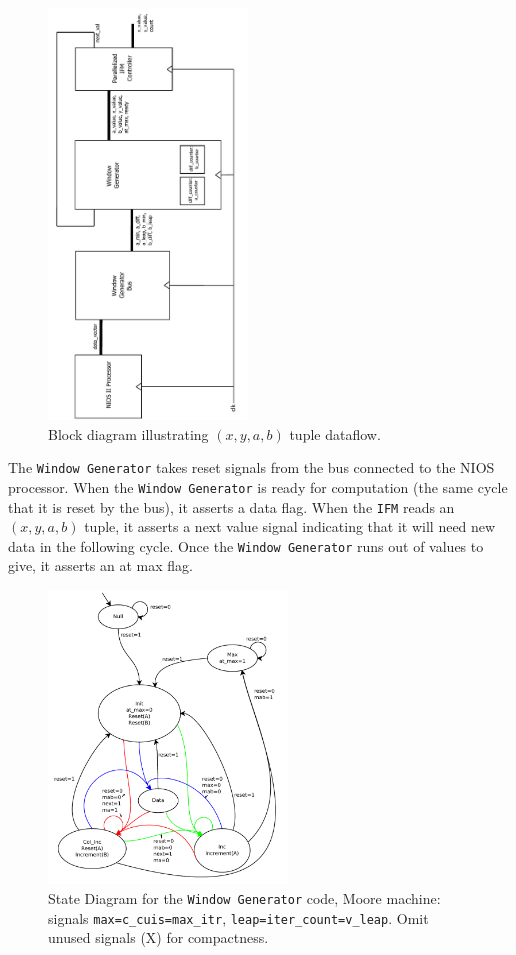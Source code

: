 \documentclass{article}
\begin{document}
\begin{figure}
  \centering
    \includegraphics[width=150pt, angle=270]{block_diagrams/win_gen_interior.pdf}
  \caption{Block diagram illustrating $(x, y, a, b)$ tuple dataflow.}
\end{figure}

The \texttt{Window Generator} takes reset signals from the bus connected to the NIOS processor. When the \texttt{Window
Generator} is ready for computation (the same cycle that it is reset by the bus), it asserts a data flag.
When the \texttt{IFM} reads an $(x, y, a, b)$ tuple, it asserts a next value signal indicating that it will need new data in the following cycle. Once the \texttt{Window Generator} runs out of values to give, it asserts an at max flag.

\begin{figure}
  \centering
    \includegraphics[width=180pt]{state_diagrams/diff_window_gen.pdf}
  \caption{State Diagram for the \texttt{Window Generator} code, Moore machine:
    signals \texttt{max=c\_cuis=max\_itr},
    \texttt{leap=iter\_count=v\_leap}. Omit unused signals (X) for
    compactness.}
\end{figure}
\end{document}
